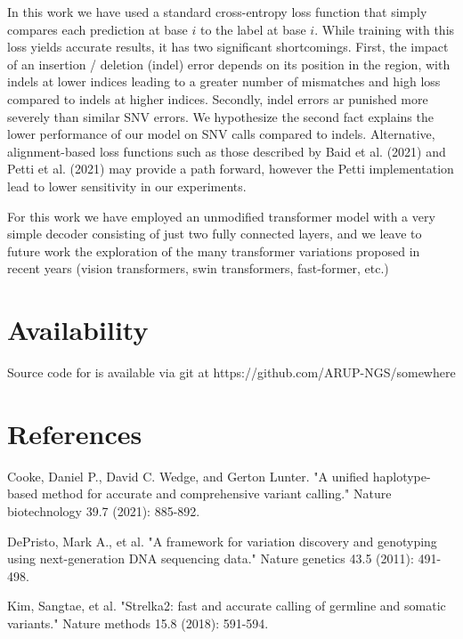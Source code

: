 \documentclass[]{article}
\begin{document}
In this work we have used a standard cross-entropy loss function that simply compares each prediction at base $i$ to the label at base $i$. While training with this loss yields accurate results, it has two significant shortcomings. First, the impact of an insertion / deletion (indel) error depends on its position in the region, with indels at lower indices leading to a greater number of mismatches and high loss compared to indels at higher indices. Secondly, indel errors ar punished more severely than similar SNV errors. We hypothesize the second fact explains the lower performance of our model on SNV calls compared to indels. Alternative, alignment-based loss functions such as those described by Baid et al. (2021) and Petti et al. (2021) may provide a path forward, however the Petti implementation lead to lower sensitivity in our experiments.  


 
For this work we have employed an unmodified transformer model with a very simple decoder consisting of just two fully connected layers, and we leave to future work the exploration of the many transformer variations proposed in recent years (vision transformers, swin transformers, fast-former, etc.) 

\section{Availability}
 
 Source code for is available via git at https://github.com/ARUP-NGS/somewhere
 
\section{References}
 
\vspace{8pt}
Cooke, Daniel P., David C. Wedge, and Gerton Lunter. "A unified haplotype-based method for accurate and comprehensive variant calling." Nature biotechnology 39.7 (2021): 885-892.

\vspace{8pt}
DePristo, Mark A., et al. "A framework for variation discovery and genotyping using next-generation DNA sequencing data." Nature genetics 43.5 (2011): 491-498.


\vspace{8pt}
Kim, Sangtae, et al. "Strelka2: fast and accurate calling of germline and somatic variants." Nature methods 15.8 (2018): 591-594.
\end{document}
